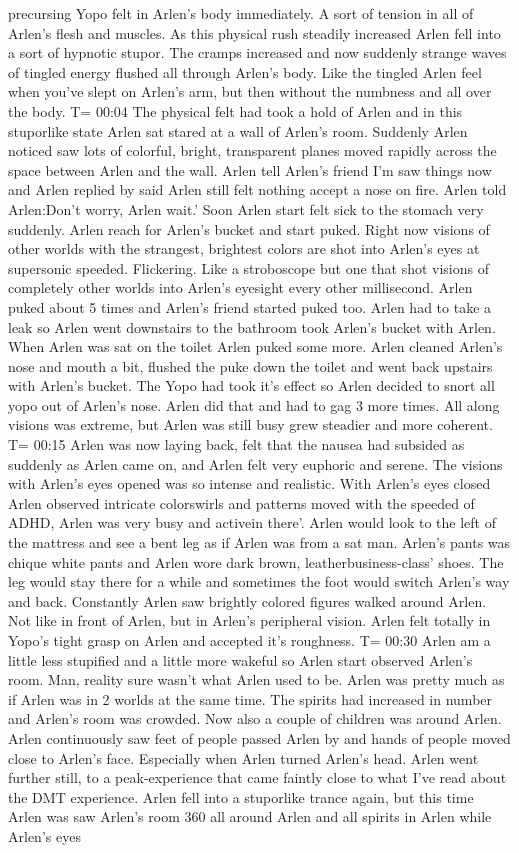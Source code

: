 \documentclass[12pt]{book}
\begin{document}
precursing Yopo felt in Arlen's body immediately. A sort of tension in all of Arlen's flesh and muscles. As this physical rush steadily increased Arlen fell into a sort of hypnotic stupor. The cramps increased and now suddenly strange waves of tingled energy flushed all through Arlen's body. Like the tingled Arlen feel when you've slept on Arlen's arm, but then without the numbness and all over the body. T= 00:04 The physical felt had took a hold of Arlen and in this stuporlike state Arlen sat stared at a wall of Arlen's room. Suddenly Arlen noticed saw lots of colorful, bright, transparent planes moved rapidly across the space between Arlen and the wall. Arlen tell Arlen's friend I'm saw things now and Arlen replied by said Arlen still felt nothing accept a nose on fire. Arlen told Arlen:Don't worry, Arlen wait.' Soon Arlen start felt sick to the stomach very suddenly. Arlen reach for Arlen's bucket and start puked. Right now visions of other worlds with the strangest, brightest colors are shot into Arlen's eyes at supersonic speeded. Flickering. Like a stroboscope but one that shot visions of completely other worlds into Arlen's eyesight every other millisecond. Arlen puked about 5 times and Arlen's friend started puked too. Arlen had to take a leak so Arlen went downstairs to the bathroom took Arlen's bucket with Arlen. When Arlen was sat on the toilet Arlen puked some more. Arlen cleaned Arlen's nose and mouth a bit, flushed the puke down the toilet and went back upstairs with Arlen's bucket. The Yopo had took it's effect so Arlen decided to snort all yopo out of Arlen's nose. Arlen did that and had to gag 3 more times. All along visions was extreme, but Arlen was still busy grew steadier and more coherent. T= 00:15 Arlen was now laying back, felt that the nausea had subsided as suddenly as Arlen came on, and Arlen felt very euphoric and serene. The visions with Arlen's eyes opened was so intense and realistic. With Arlen's eyes closed Arlen observed intricate colorswirls and patterns moved with the speeded of ADHD, Arlen was very busy and activein there'. Arlen would look to the left of the mattress and see a bent leg as if Arlen was from a sat man. Arlen's pants was chique white pants and Arlen wore dark brown, leatherbusiness-class' shoes. The leg would stay there for a while and sometimes the foot would switch Arlen's way and back. Constantly Arlen saw brightly colored figures walked around Arlen. Not like in front of Arlen, but in Arlen's peripheral vision. Arlen felt totally in Yopo's tight grasp on Arlen and accepted it's roughness. T= 00:30 Arlen am a little less stupified and a little more wakeful so Arlen start observed Arlen's room. Man, reality sure wasn't what Arlen used to be. Arlen was pretty much as if Arlen was in 2 worlds at the same time. The spirits had increased in number and Arlen's room was crowded. Now also a couple of children was around Arlen. Arlen continuously saw feet of people passed Arlen by and hands of people moved close to Arlen's face. Especially when Arlen turned Arlen's head. Arlen went further still, to a peak-experience that came faintly close to what I've read about the DMT experience. Arlen fell into a stuporlike trance again, but this time Arlen was saw Arlen's room 360 all around Arlen and all spirits in Arlen while Arlen's eyes 
\end{document}
